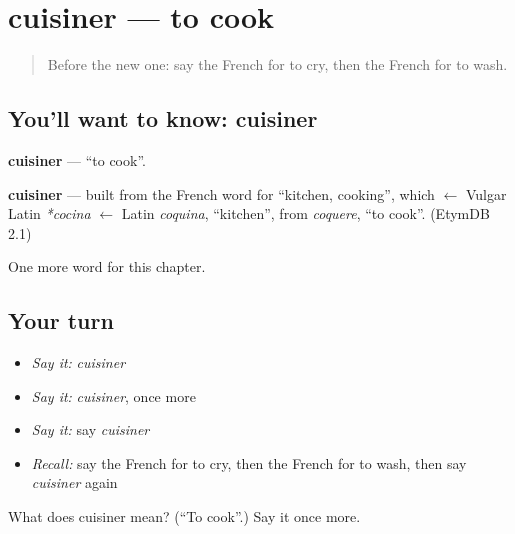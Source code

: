\section[cuisiner]{cuisiner — to cook}

\label{lesson:FR-C60-cuisiner}



\begin{quote}
Before the new one: say the French for to cry, then the French for to wash.
\end{quote}

\subsection*{You'll want to know: cuisiner}
\textbf{cuisiner} — \textquotedblleft{}to cook\textquotedblright{}.

\begin{cousinweb}
\textbf{cuisiner} — built from the French word for \textquotedblleft{}kitchen, cooking\textquotedblright{}, which $\leftarrow$ Vulgar Latin \emph{*cocina} $\leftarrow$ Latin \emph{coquina}, \textquotedblleft{}kitchen\textquotedblright{}, from \emph{coquere}, \textquotedblleft{}to cook\textquotedblright{}. (EtymDB 2.1)
\end{cousinweb}

\begin{grammarlens}[title={What you've built}]
One more word for this chapter.
\end{grammarlens}

\subsection*{Your turn}
\begin{itemize}
\raggedright
  \item \emph{Say it:} \emph{cuisiner}
  \item \emph{Say it:} \emph{cuisiner}, once more
  \item \emph{Say it:} say \emph{cuisiner}
  \item \emph{Recall:} say the French for to cry, then the French for to wash, then say \emph{cuisiner} again
\end{itemize}

\begin{tcolorbox}[breakable,colback=teal!4,colframe=teal!35!black,title={Before you move on}]
What does cuisiner mean? (\textquotedblleft{}To cook\textquotedblright{}.) Say it once more.
\end{tcolorbox}
